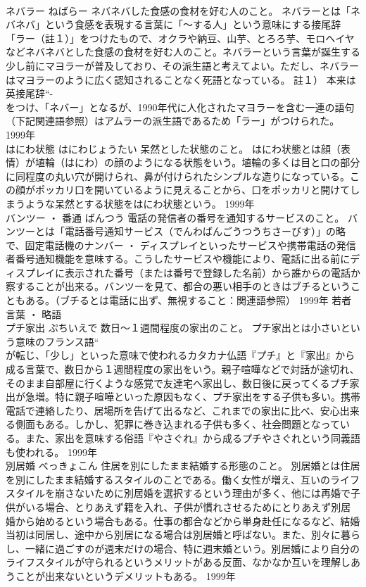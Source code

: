 \documentclass[8pt]{extreport}
\begin{document}
\begin{CJK}{UTF8}{min}
\\	ネバラー	ねばらー	ネバネバした食感の食材を好む人のこと。	ネバラーとは「ネバネバ」という食感を表現する言葉に「～する人」という意味にする接尾辞「ラー（註１）」をつけたもので、オクラや納豆、山芋、とろろ芋、モロヘイヤなどネバネバとした食感の食材を好む人のこと。ネバラーという言葉が誕生する少し前にマヨラーが普及しており、その派生語と考えてよい。ただし、ネバラーはマヨラーのように広く認知されることなく死語となっている。 註１） 本来は英接尾辞“-
\\	をつけ、「ネバー」となるが、1990年代に人化されたマヨラーを含む一連の語句（下記関連語参照）はアムラーの派生語であるため「ラー」がつけられた。	1999年	
\\	はにわ状態	はにわじょうたい	呆然とした状態のこと。	はにわ状態とは顔（表情）が埴輪（はにわ）の顔のようになる状態をいう。埴輪の多くは目と口の部分に同程度の丸い穴が開けられ、鼻が付けられたシンプルな造りになっている。この顔がポッカリ口を開いているように見えることから、口をポッカリと開けてしまうような呆然とする状態をはにわ状態という。	1999年	
\\	バンツー ・ 番通	ばんつう	電話の発信者の番号を通知するサービスのこと。	バンツーとは「電話番号通知サービス（でんわばんごうつうちさーびす）」の略で、固定電話機のナンバー ・ ディスプレイといったサービスや携帯電話の発信者番号通知機能を意味する。こうしたサービスや機能により、電話に出る前にディスプレイに表示された番号（または番号で登録した名前）から誰からの電話か察することが出来る。バンツーを見て、都合の悪い相手のときはブチるということもある。（ブチるとは電話に出ず、無視すること：関連語参照）	1999年	若者言葉 ・ 略語	
\\	プチ家出	ぷちいえで	数日～１週間程度の家出のこと。	プチ家出とは小さいという意味のフランス語“
\\	が転じ、「少し」といった意味で使われるカタカナ仏語『プチ』と『家出』から成る言葉で、数日から１週間程度の家出をいう。親子喧嘩などで対話が途切れ、そのまま自部屋に行くような感覚で友達宅へ家出し、数日後に戻ってくるプチ家出が急増。特に親子喧嘩といった原因もなく、プチ家出をする子供も多い。携帯電話で連絡したり、居場所を告げて出るなど、これまでの家出に比べ、安心出来る側面もある。しかし、犯罪に巻き込まれる子供も多く、社会問題となっている。また、家出を意味する俗語『やさぐれ』から成るプチやさぐれという同義語も使われる。	1999年	
\\	別居婚	べっきょこん	住居を別にしたまま結婚する形態のこと。	別居婚とは住居を別にしたまま結婚するスタイルのことである。働く女性が増え、互いのライフスタイルを崩さないために別居婚を選択するという理由が多く、他には再婚で子供がいる場合、とりあえず籍を入れ、子供が慣れさせるためにとりあえず別居婚から始めるという場合もある。仕事の都合などから単身赴任になるなど、結婚当初は同居し、途中から別居になる場合は別居婚と呼ばない。また、別々に暮らし、一緒に過ごすのが週末だけの場合、特に週末婚という。別居婚により自分のライフスタイルが守られるというメリットがある反面、なかなか互いを理解しあうことが出来ないというデメリットもある。	1999年	

\end{CJK}
\end{document}

